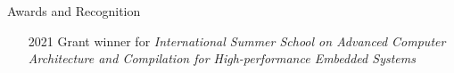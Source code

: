 \documentclass[
	a4paper, %
	11pt, %
]{resume} %
\newif\ifpublic{}
\begin{document}
\begin{rSection}{Awards and Recognition}
  \begin{itemize}
  \item[2021] Grant winner for \emph{International Summer School on Advanced
      Computer Architecture and Compilation for High-performance Embedded
      Systems}
  \end{itemize}
\end{rSection}
\vfill
\ifpublic{%
    
    
  }
\fi
\end{document}
